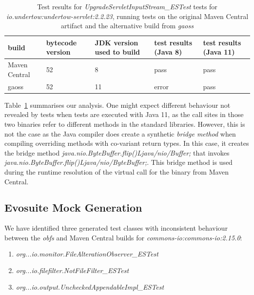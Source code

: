 \documentclass[conference]{IEEEtran}
\begin{document}
\begin{table}[h]
	\begin{tabular}{|p{1.8cm}p{0.9cm}p{1.5cm}p{1.2cm}p{1.2cm}|}
		\hline
		build         & bytecode version & JDK version used to build & test results (Java 8)                                                    & test results (Java 11) \\ \hline 
		Maven Central & 52               & 8                         & pass                                                                     & pass                   \\
		gaoss         & 52               & 11                        & error & pass                  \\ \hline
	\end{tabular}
	\caption{Test results for \textit{UpgradeServletInputStream\_ESTest} tests for  \textit{io.undertow:undertow-servlet:2.2.23}, running tests on the original Maven Central artifact and the alternative build from \textit{gaoss}}
	\label{tab:nosuchmethoderror}
\end{table}

Table~\ref{tab:nosuchmethoderror} summarises our analysis. One might expect different behaviour not revealed by tests when tests are executed with Java 11, as the call sites in those two binaries refer to different methods in the standard libraries. However, this is not the case as the Java compiler does create a synthetic \textit{bridge method} when compiling overriding methods with co-variant return types. In this case, it creates the bridge method \textit{java.nio.ByteBuffer.flip()Ljava/nio/Buffer;}  that invokes \textit{java.nio.ByteBuffer.flip()Ljava/nio/ByteBuffer;}. This bridge method is used during the  runtime resolution of the virtual call for the binary from Maven Central.  


\subsection{Evosuite Mock Generation}


We have identified three generated test classes with inconsistent behaviour between the \textit{obfs} and Maven Central builds for \textit{commons-io:commons-io:2.15.0}: 
\begin{enumerate}
	\item  \textit{org...io.monitor.FileAlterationObserver\_ESTest}
    \item \textit{ org...io.filefilter.NotFileFilter\_ESTest}
    \item  \textit{org...io.output.UncheckedAppendableImpl\_ESTest}
\end{enumerate}
\end{document}
